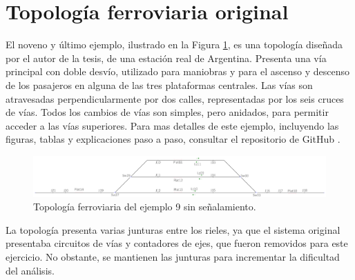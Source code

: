 \section{Topología ferroviaria original}

	El noveno y último ejemplo, ilustrado en la Figura \ref{fig:EJ9_1}, es una topología diseñada por el autor de la tesis, de una estación real de Argentina. Presenta una vía principal con doble desvío, utilizado para maniobras y para el ascenso y descenso de los pasajeros en alguna de las tres plataformas centrales. Las vías son atravesadas perpendicularmente por dos calles, representadas por los seis cruces de vías. Todos los cambios de vías son simples, pero anidados, para permitir acceder a las vías superiores.	Para mas detalles de este ejemplo, incluyendo las figuras, tablas y explicaciones paso a paso, consultar el repositorio de GitHub \cite{GITHUB_PHD}.
	
	\begin{figure}[h]
		\centering
		\includegraphics[width=1\textwidth]{resultados-obtenidos/ejemplo9/images/9_empty.png}
		\centering\caption{Topología ferroviaria del ejemplo 9 sin señalamiento.}
		\label{fig:EJ9_1}
	\end{figure}
	
	La topología presenta varias junturas entre los rieles, ya que el sistema original presentaba circuitos de vías y contadores de ejes, que fueron removidos para este ejercicio. No obstante, se mantienen las junturas para incrementar la dificultad del análisis.